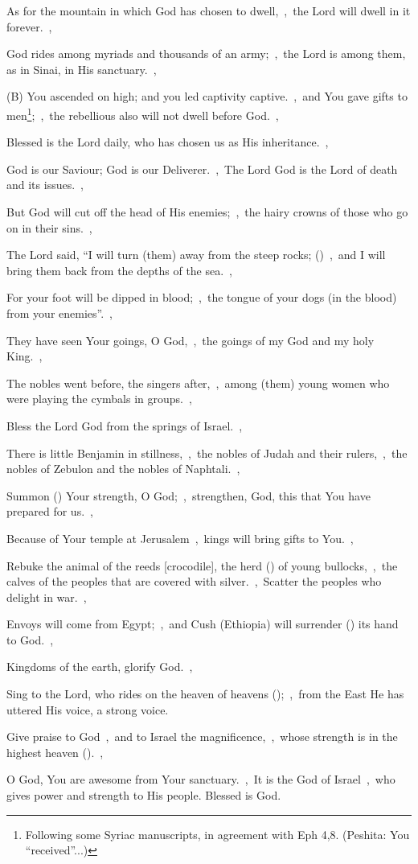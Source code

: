 \documentclass[12pt,twoside,a5paper]{article}
\begin{document}
\begin{normalparskip}
  As for the mountain in which God has chosen to dwell,~\sep\ the Lord will dwell in it forever.~\sep

  God rides among myriads and thousands of an army;~\sep\ the Lord is among them, as in Sinai, in His sanctuary.~\sep

  (B) You ascended on high; and you led captivity captive.~\sep\ and You gave gifts to men\footnote{Following some Syriac manuscripts, in agreement with Eph 4,8. (Peshita: You ``received''...)};~\sep\ the rebellious also will not dwell before God.~\sep

  Blessed is the Lord daily, who has chosen us as His inheritance.~\sep

  God is our Saviour; God is our Deliverer.~\sep\ The Lord God is the Lord of death and its issues.~\sep

  But God will cut off the head of His enemies;~\sep\ the hairy crowns of those who go on in their sins.~\sep

  The Lord said, ``I will turn (them) away from the steep rocks; ()~\sep\ and I will bring them back from the depths of the sea.~\sep

  For your foot will be dipped in blood;~\sep\ the tongue of your dogs (in the blood) from your enemies''.~\sep

  They have seen Your goings, O God,~\sep\ the goings of my God and my holy King.~\sep

  The nobles went before, the singers after,~\sep\ among (them) young women who were playing the cymbals in groups.~\sep

  Bless the Lord God from the springs of Israel.~\sep

  There is little Benjamin in stillness,~\sep\ the nobles of Judah and their rulers,~\sep\ the nobles of Zebulon and the nobles of Naphtali.~\sep

  Summon () Your strength, O God;~\sep\ strengthen, God, this that You have prepared for us.~\sep

  Because of Your temple at Jerusalem~\sep\ kings will bring gifts to You.~\sep

  Rebuke the animal of the reeds [crocodile], the herd () of young bullocks,~\sep\ the calves of the peoples that are covered with silver.~\sep\ Scatter the peoples who delight in war.~\sep

  Envoys will come from Egypt;~\sep\ and Cush (Ethiopia) will surrender () its hand to God.~\sep

  Kingdoms of the earth, glorify God.~\sep

  Sing to the Lord, who rides on the heaven of heavens ();~\sep\ from the East He has uttered His voice, a strong voice.

  Give praise to God~\sep\ and to Israel the magnificence,~\sep\ whose strength is in the highest heaven ().~\sep

  O God, You are awesome from Your sanctuary.~\sep\ It is the God of Israel~\sep\ who gives power and strength to His people. Blessed is God.
\end{normalparskip}
\end{document}
